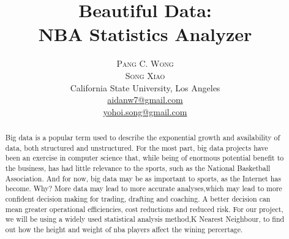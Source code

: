 \documentclass[twoside]{article}
\title{\vspace{-15mm}\fontsize{24pt}{10pt}\selectfont\textbf{Beautiful Data: \\[2mm] NBA Statistics Analyzer}} %
\author{
\large
\textsc{Pang C. Wong}\\%
\textsc{Song Xiao}\\%
\normalsize California State University, Los Angeles \\[2mm] %
\normalsize \href{mailto:aidanw7@gmail.com}{aidanw7@gmail.com}\\ %
\normalsize \href{mailto:yoho.song@gmail.com}{yohoi.song@gmail.com}\\ %
\vspace{-5mm}
}
\date{}
\begin{document}
\maketitle{} %

\thispagestyle{fancy} %


\begin{abstract}

\noindent Big data is a popular term used to describe the exponential growth and availability of data, both structured and unstructured. For the most part, big data projects have been an exercise in computer science that, while being of enormous potential benefit to the business, has had little relevance to the sports, such as the National Basketball Association. And for now, big data may be as important to sports, as the Internet has become. Why? More data may lead to more accurate analyses,which may lead to more confident decision making for trading, drafting and coaching. A better decision can mean greater operational efficiencies, cost reductions and reduced risk. For our project, we will be using a widely used statistical analysis method,K Nearest Neighbour, to find out how the height and weight of nba players affect the wining percertage.

\end{abstract}


\end{document}
